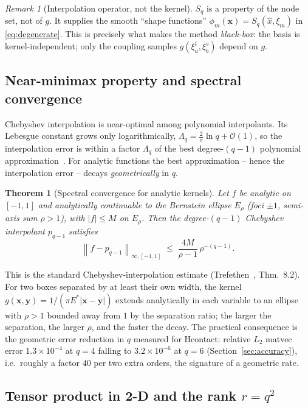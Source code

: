 \documentclass[11pt,a4paper]{article}
\newcommand{\Es}{E^{*}}
\newcommand{\Order}{\mathcal{O}}
\newcommand{\norm}[1]{\left\lVert #1 \right\rVert}
\newcommand{\abs}[1]{\left\lvert #1 \right\rvert}
\newcommand{\xx}{\mathbf{x}}
\newcommand{\yy}{\mathbf{y}}
\newtheorem{theorem}{Theorem}
\theoremstyle{definition}
\theoremstyle{remark}
\newtheorem{remark}{Remark}
\begin{document}
\begin{remark}[Interpolation operator, not the kernel]
$S_q$ is a property of the node set, not of $g$. It supplies the smooth
``shape functions'' $\phi_m(\xx)=S_q(\hat x,\xi_m)$ in \eqref{eq:degenerate}.
This is precisely what makes the method \emph{black-box}: the basis is
kernel-independent; only the coupling samples $g(\xi_a^t,\xi_b^s)$ depend on $g$.
\end{remark}

\subsection{Near-minimax property and spectral convergence}

Chebyshev interpolation is near-optimal among polynomial interpolants. Its
Lebesgue constant grows only logarithmically,
$\Lambda_q = \tfrac{2}{\pi}\ln q + \Order(1)$, so the interpolation error is
within a factor $\Lambda_q$ of the best degree-$(q{-}1)$ polynomial
approximation~\cite{Trefethen2013}. For analytic functions the best
approximation -- hence the interpolation error -- decays \emph{geometrically} in
$q$.

\begin{theorem}[Spectral convergence for analytic kernels]
\label{thm:cheb-conv}
Let $f$ be analytic on $[-1,1]$ and analytically continuable to the Bernstein
ellipse $E_\rho$ (foci $\pm1$, semi-axis sum $\rho>1$), with $\abs{f}\le M$ on
$E_\rho$. Then the degree-$(q{-}1)$ Chebyshev interpolant $p_{q-1}$ satisfies
\begin{equation}
  \norm{f-p_{q-1}}_{\infty,[-1,1]} \;\le\; \frac{4M}{\rho-1}\,\rho^{-(q-1)}.
  \label{eq:cheb-bound}
\end{equation}
\end{theorem}
This is the standard Chebyshev-interpolation estimate
(Trefethen~\cite{Trefethen2013}, Thm.~8.2). For two boxes separated by at least
their own width, the kernel $g(\xx,\yy)=1/(\pi\Es\abs{\xx-\yy})$ extends
analytically in each variable to an ellipse with $\rho>1$ bounded away from $1$
by the separation ratio; the larger the separation, the larger $\rho$, and the
faster the decay. The practical consequence is the geometric error reduction in
$q$ measured for Hcontact: relative $L_2$ matvec error
$1.3\times10^{-4}$ at $q=4$ falling to $3.2\times10^{-6}$ at $q=6$
(Section~\ref{sec:accuracy}), i.e.\ roughly a factor $40$ per two extra orders,
the signature of a geometric rate.

\subsection{Tensor product in 2-D and the rank $r=q^2$}
\end{document}

